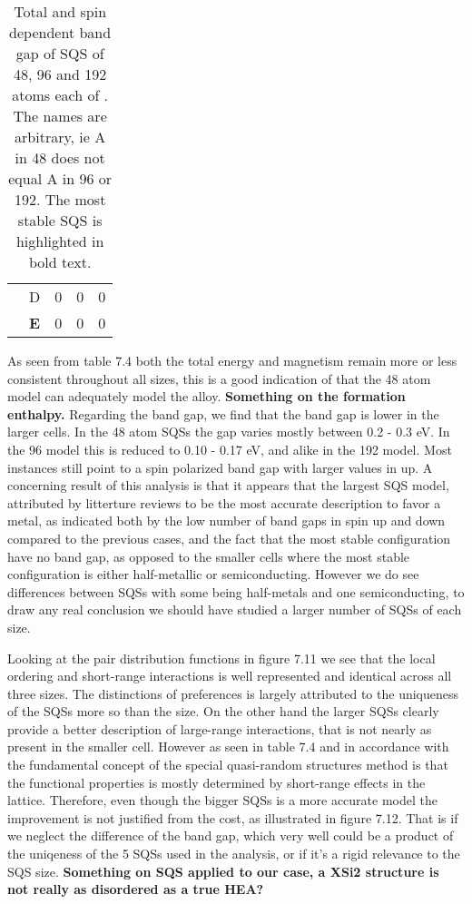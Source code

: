 \begin{table}[H]
\begin{tabular}{@{}ccccc@{}}
\multicolumn{1}{c|}{}                                & D & 0                     & 0                       & 0          \\
\multicolumn{1}{c|}{}                                & \textbf{E} & 0                & 0                       & 0                   \\ \bottomrule
\end{tabular}
\caption{Total and spin dependent band gap of SQS of 48, 96 and 192 atoms each of . The names are arbitrary, ie A in 48 does not equal A in 96 or 192. The most stable SQS is highlighted in bold text.}
\end{table}

As seen from table 7.4 both the total energy and magnetism remain more or less consistent throughout all sizes, this is a good indication of that the 48 atom model can adequately model the alloy. \textbf{Something on the formation enthalpy.} Regarding the band gap, we find that the band gap is lower in the larger cells. In the 48 atom SQSs the gap varies mostly between 0.2 - 0.3 eV. In the 96 model this is reduced to 0.10 - 0.17 eV, and alike in the 192 model. Most instances still point to a spin polarized band gap with larger values in up. A concerning result of this analysis is that it appears that the largest SQS model, attributed by litterture reviews to be the most accurate description to favor a metal, as indicated both by the low number of band gaps in spin up and down compared to the previous cases, and the fact that the most stable configuration have no band gap, as opposed to the smaller cells where the most stable configuration is either half-metallic or semiconducting. However we do see differences between SQSs with some being half-metals and one semiconducting, to draw any real conclusion we should have studied a larger number of SQSs of each size. 

Looking at the pair distribution functions in figure 7.11 we see that the local ordering and short-range interactions is well represented and identical across all three sizes. The distinctions of preferences is largely attributed to the uniqueness of the SQSs more so than the size. On the other hand the larger SQSs clearly provide a better description of large-range interactions, that is not nearly as present in the smaller cell. However as seen in table 7.4 and in accordance with the fundamental concept of the special quasi-random structures method is that the functional properties is mostly determined by short-range effects in the lattice. Therefore, even though the bigger SQSs is a more accurate model the improvement is not justified from the cost, as illustrated in figure 7.12. That is if we neglect the difference of the band gap, which very well could be a product of the uniqeness of the 5 SQSs used in the analysis, or if it's a rigid relevance to the SQS size. \textbf{Something on SQS applied to our case, a XSi2 structure is not really as disordered as a true HEA?}      


